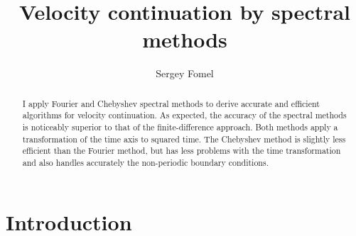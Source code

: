 
\title{Velocity continuation by spectral methods}


\author{Sergey Fomel}

\maketitle

\begin{abstract}
I apply Fourier and Chebyshev spectral methods to derive accurate
  and efficient algorithms for velocity continuation.  As expected,
  the accuracy of the spectral methods is noticeably superior to that
  of the finite-difference approach. Both methods apply a
  transformation of the time axis to squared time. The Chebyshev
  method is slightly less efficient than the Fourier method, but has
  less problems with the time transformation and also handles
  accurately the non-periodic boundary conditions.
\end{abstract}

\section{Introduction}



